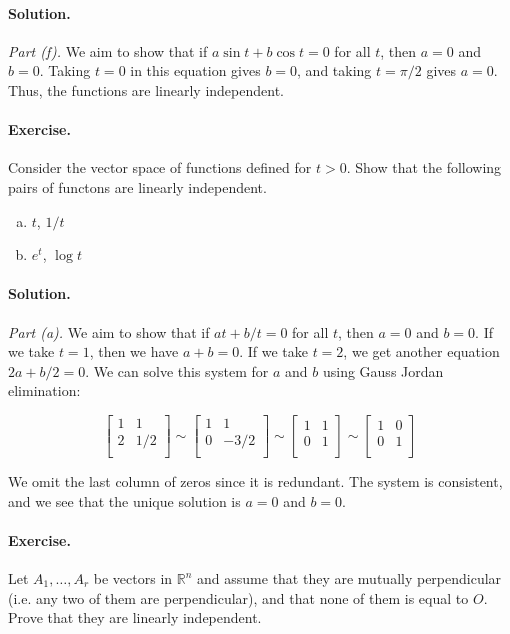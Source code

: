\documentclass[12pt, titlepage]{article}
\newenvironment{exercise}{\paragraph{Exercise.}}{}
\newenvironment{solution}{\paragraph{Solution.}}{}
\newcommand{\R}{\mathbb{R}}
\begin{document}
\begin{solution}
  \textit{Part (f).} We aim to show that if $a\sin t + b\cos t = 0$ for all
  $t$, then $a = 0$ and $b = 0$. Taking $t = 0$ in this equation gives $b = 0$,
  and taking $t = \pi/2$ gives $a = 0$. Thus, the functions are linearly
  independent.
\end{solution}

\begin{exercise}
  Consider the vector space of functions defined for $t > 0$. Show that the
  following pairs of functons are linearly independent.

  \begin{enumerate}[(a), noitemsep]
    \item $t$, $1 / t$
    \item $e^t$, $\log t$
  \end{enumerate}
\end{exercise}

\begin{solution}
  \textit{Part (a).} We aim to show that if $at + b / t = 0$ for all $t$, then
  $a = 0$ and $b = 0$. If we take $t = 1$, then we have $a + b = 0$. If we take
  $t = 2$, we get another equation $2a + b/2 = 0$. We can solve this system for
  $a$ and $b$ using Gauss Jordan elimination:

  \[
    \begin{bmatrix}
      1 & 1   \\
      2 & 1/2 \\
    \end{bmatrix}
    \sim \begin{bmatrix}
      1 & 1    \\
      0 & -3/2 \\
    \end{bmatrix}
    \sim \begin{bmatrix}
      1 & 1 \\
      0 & 1 \\
    \end{bmatrix}
    \sim \begin{bmatrix}
      1 & 0 \\
      0 & 1 \\
    \end{bmatrix}
  \]

  We omit the last column of zeros since it is redundant. The system is
  consistent, and we see that the unique solution is $a = 0$ and $b = 0$.
\end{solution}

\begin{exercise}
  Let $A_1, \dots, A_r$ be vectors in $\R^n$ and assume that they are mutually
  perpendicular (i.e. any two of them are perpendicular), and that none of them
  is equal to $O$. Prove that they are linearly independent.
\end{exercise}
\end{document}
